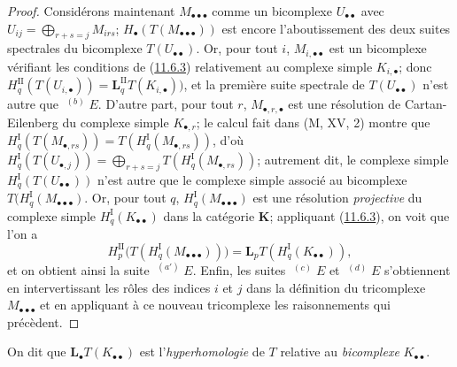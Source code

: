 \begin{proof}
Considérons maintenant $M_{\bullet\bullet\bullet}$ comme un bicomplexe
$U_{\bullet\bullet}$ avec
$U_{ij}=\bigoplus_{r+s=j}M_{irs}$;
$H_\bullet(T(M_{\bullet\bullet\bullet}))$ est encore l'aboutissement des deux
suites spectrales du bicomplexe $T(U_{\bullet\bullet})$. Or, pour tout $i$,
$M_{i,\bullet\bullet}$ est un bicomplexe vérifiant les conditions de
(\hyperref[0.11.6.3-fr]{11.6.3}) relativement au complexe simple
$K_{i,\bullet}$; donc
$H_q^{\mathrm{II}}(T(U_{i,\bullet}))=
\mathbf{L}_q^{\mathrm{II}}T(K_{i,\bullet}))$, et la première suite spectrale de
$T(U_{\bullet\bullet})$ n'est autre que $\mathop{}^{(b)}E$. D'autre part, pour
tout $r$, $M_{\bullet,r,\bullet}$ est une résolution de Cartan-Eilenberg du
complexe simple $K_{\bullet,r}$; le calcul fait dans (M, XV, 2) montre que
$H_q^{\mathrm I}(T(M_{\bullet,rs}))=T(H_q^{\mathrm I}(M_{\bullet,rs}))$,
d'où $H_q^{\mathrm I}(T(U_{\bullet,j}))=\bigoplus_{r+s=j}T(H_q^{\mathrm I}(M_{\bullet,rs}))$;
autrement dit, le complexe simple
$H_q^{\mathrm I}(T(U_{\bullet\bullet}))$ n'est autre que le complexe simple
associé au bicomplexe
$T(H_q^{\mathrm I}(M_{\bullet\bullet\bullet})$. Or, pour tout $q$,
$H_q^{\mathrm I}(M_{\bullet\bullet\bullet})$ est une résolution \emph{projective} du
complexe simple $H_q^{\mathrm I}(K_{\bullet\bullet})$ dans la catégorie
$\boldsymbol{K}$; appliquant (\hyperref[0.11.6.3-fr]{11.6.3}), on voit que l'on a
\[
H_p^{\mathrm{II}}
\bigl(T(H_q^{\mathrm I}(M_{\bullet\bullet\bullet}))\bigr)
=\mathbf{L}_pT(H_q^{\mathrm I}(K_{\bullet\bullet})),
\]
et on obtient ainsi la suite $\mathop{}^{(a')}E$. Enfin, les suites
$\mathop{}^{(c)}E$ et $\mathop{}^{(d)}E$ s'obtiennent en intervertissant les
rôles des indices $i$ et $j$ dans la définition du tricomplexe
$M_{\bullet\bullet\bullet}$ et en appliquant à ce nouveau tricomplexe les
raisonnements qui précèdent.
\end{proof}

On dit que $\mathbf{L}_\bullet T(K_{\bullet\bullet})$ est l'\emph{hyperhomologie} de
$T$ relative au \emph{bicomplexe} $K_{\bullet\bullet}$.

